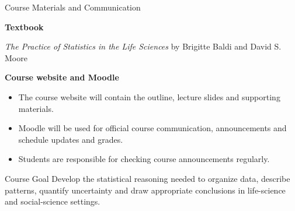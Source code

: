 \documentclass[aspectratio=169,10pt]{beamer}
\begin{document}

\begin{frame}{Course Materials and Communication}

\textbf{Textbook}

\vspace{1mm}

\emph{The Practice of Statistics in the Life Sciences} by Brigitte Baldi and David S. Moore

\vspace{4mm}

\textbf{Course website and Moodle}

\begin{itemize}
  \item The course website will contain the outline, lecture slides and supporting materials.
  \item Moodle will be used for official course communication, announcements and schedule updates and grades.
  \item Students are responsible for checking course announcements regularly.
\end{itemize}

\begin{block}{Course Goal}
Develop the statistical reasoning needed to organize data, describe patterns, quantify uncertainty and draw appropriate conclusions in life-science and social-science settings.
\end{block}

\end{frame}

\end{document}
